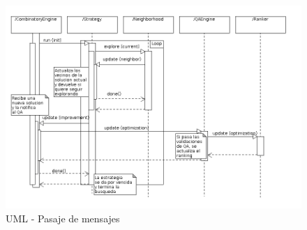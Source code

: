 \begin{figure}
  \centering
  \includegraphics[scale=0.45]{sequence.png}  
  \caption{UML - Pasaje de mensajes}
  \label{uml:sequence}
\end{figure}

